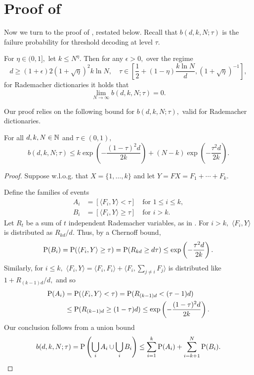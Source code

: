 \section{Proof of  \label{appendix:sufficient}}

Now we turn to the proof of , restated below. Recall that $b(d, k, N; \tau)$ is the failure probability for threshold decoding at level $\tau.$

 \begin{proposition*}
    For $\eta \in (0, 1],$ let $k \le N^\eta.$ Then for any $\epsilon > 0,$ over the regime
	$$
	d \ge (1 + \epsilon) 2(1 + \sqrt \eta)^2 k \ln N, \quad \tau \in \left [\frac 1 2 + (1 - \eta) \frac{k \ln N} d, (1 + \sqrt \eta)^{-1} \right],
	$$
	for Rademacher dictionaries it holds that
	$$
	\lim_{N \to \infty} b(d, k, N; \tau) = 0.
	$$
\end{proposition*}

Our proof relies on the following bound for $b(d, k, N; \tau),$ valid for Rademacher dictionaries.

\begin{lemma}\label{lemma:b-bound}
For all $d, k, N \in \mathbb{N}$ and $\tau \in (0, 1),$
$$
b(d, k, N; \tau) \le
k \exp\left( - \frac{(1 - \tau)^2 d}{2 k} \right) + (N - k) \exp\left( - \frac{\tau^2 d} {2 k} \right).
$$
\end{lemma}

\begin{proof}
Suppose w.l.o.g. that $X = \{1, \dots, k\}$ and let $Y = FX = F_1 + \cdots + F_k.$

Define the families of events
\begin{align*}
    A_i &= [\langle F_i, Y \rangle < \tau] \quad \text{for } 1 \le i \le k, \\
    B_i &= [\langle F_i, Y \rangle \ge \tau] \quad \text{for } i > k.
\end{align*}
Let $R_t$ be a sum of $t$ independent Rademacher variables, as in . For $i > k,$ $\langle F_i, Y \rangle$ is distributed as $R_{kd}/d.$ Thus, by a Chernoff bound,
$$
\operatorname{P}(B_i) = \operatorname{P}(\langle F_i, Y \rangle \ge \tau) = \operatorname{P}(R_{kd} \ge d\tau) \le \exp\left(-\frac{\tau^2 d}{2k}\right).
$$
Similarly, for $i \le k,$ $\langle F_i, Y \rangle = \langle F_i, F_i \rangle + \langle F_i, \sum_{j \neq i} F_j \rangle$ is distributed like $1 + R_{(k-1)d}/d,$ and so
\begin{align*}
\operatorname{P}(A_i) &= \operatorname{P}(\langle F_i, Y \rangle < \tau) = \operatorname{P}(R_{(k-1)d} < (\tau - 1)d)\\
&\le \operatorname{P}(R_{(k-1)d} \ge (1-\tau)d) \le \exp\left(-\frac{(1-\tau)^2 d}{2k}\right).
\end{align*}
Our conclusion follows from a union bound
$$
b(d, k, N; \tau) = \operatorname{P}\left( \bigcup_i A_i \cup \bigcup_i B_i \right) \le \sum_{i=1}^k \operatorname{P}(A_i) + \sum_{i=k+1}^N \operatorname{P}(B_i).
$$
\end{proof}

